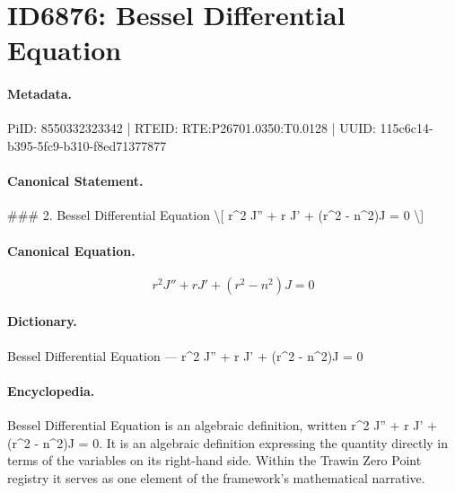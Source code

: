 \section*{ID6876: Bessel Differential Equation}
\paragraph{Metadata.}
PiID: 8550332323342 | RTEID: RTE:P26701.0350:T0.0128 | UUID: 115c6c14-b395-5fc9-b310-f8ed71377877

\paragraph{Canonical Statement.}
\#\#\# 2. Bessel Differential Equation \textbackslash{}[ r\textasciicircum{}2 J'' + r J' + (r\textasciicircum{}2 - n\textasciicircum{}2)J = 0 \textbackslash{}]

\paragraph{Canonical Equation.}
\[
r^2 J'' + r J' + (r^2 - n^2)J = 0
\]

\paragraph{Dictionary.}
Bessel Differential Equation — r\textasciicircum{}2 J'' + r J' + (r\textasciicircum{}2 - n\textasciicircum{}2)J = 0

\paragraph{Encyclopedia.}
Bessel Differential Equation is an algebraic definition, written r\textasciicircum{}2 J'' + r J' + (r\textasciicircum{}2 - n\textasciicircum{}2)J = 0. It is an algebraic definition expressing the quantity directly in terms of the variables on its right-hand side. Within the Trawin Zero Point registry it serves as one element of the framework's mathematical narrative.
